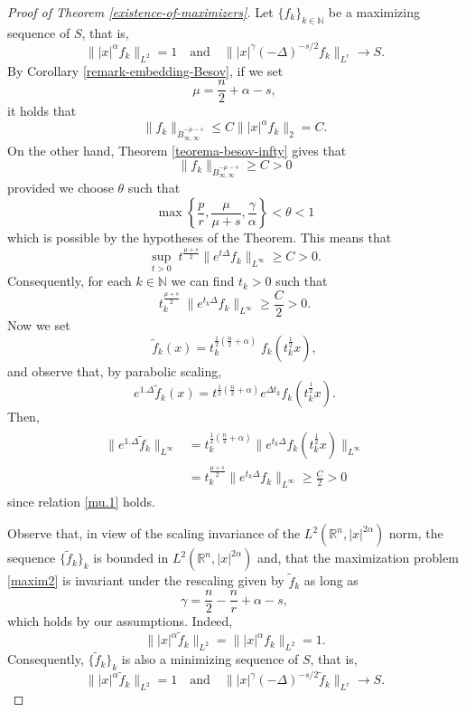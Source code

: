 \documentclass[12pt]{amsart}
\newcommand {\N}{\mathbb{N}}
\newcommand {\R}{\mathbb{R}}
\begin{document}
\begin{proof}[Proof of Theorem \ref{existence-of-maximizers}]
	Let $\{f_k\}_{k\in\N}$ be a maximizing sequence of $S$, that is, 
	\begin{equation} \label{minim}
		\| |x|^\alpha  f_k \|_{L^2} = 1  \quad\mbox{and}\quad \| |x|^\gamma  (-\Delta)^{-s/2} f_k \|_{L^r} \to S .
	\end{equation}
	By Corollary \ref{remark-embedding-Besov}, if we set
	\begin{equation} \label{mu.1}
		\mu  = \frac{n}{2} + \alpha -s,
	\end{equation}
	it holds that
	$$ 
		\| f_k \|_{\dot{B}^{-\mu-s}_{\infty,\infty}} \leq
		C \| |x|^\alpha f_k \|_2 = C.
	$$
	On the other hand, Theorem \ref{teorema-besov-infty}
 gives that
	$$
		  \| f_k \|_{\dot{B}^{-\mu-s}_{\infty,\infty}} \geq C >0 
	$$
	provided we choose $\theta$ such that 
	$$
	\max \left\{ \frac{p}{r}, \frac{\mu}{\mu+s}, \frac{\gamma}{\alpha} \right\} < \theta <1
	$$
	which is possible by the hypotheses of the Theorem.
	This means that
	$$ 
		\sup_{t>0} \;  t^\frac{\mu+s}{2} \| e^{t\Delta} f_k \|_{L^\infty} \geq C>0.
	$$ 
	Consequently, for each $k \in \N$ we can find $t_k>0$ such that
	$$ 
		t_k^\frac{\mu+s}{2} \; \|  e^{t_k\Delta} f_k \|_{L^\infty} \geq \frac{C}{2} > 0.
	$$	
	Now we set
	\begin{equation} \label{reescale}
	 \tilde{f}_k(x)= t_k^{\frac{1}{2}(\frac{n}{2}+\alpha)} \;  f_k(t_k^\frac12 x),
	\end{equation}	
	and observe that, by parabolic scaling, 
	$$
	 e^{1.\Delta} \tilde f_k (x) = t^{\frac12 (\frac{n}{2}+\alpha)} e^{\Delta t_k} f_k( t_k^{\frac12} x).
	$$	
	Then,
	\begin{align} \label{ectt}
	\begin{split}
		\|  e^{1.\Delta} \tilde f_k\|_{L^\infty}&=t_k^{\frac{1}{2}(\frac{n}{2}+\alpha)}
		\| e^{t_k\Delta}   f_k(t_k^\frac12 x)\|_{L^\infty}\\
		&=t_k^\frac{\mu+s}{2}  \|   e^{t_k \Delta}   f_k\|_{L^\infty} \geq \frac{C}{2}>0
	\end{split}		
	\end{align} 	
	since relation \eqref{mu.1} holds.

	Observe that, in view of the scaling invariance of the $L^2(\R^n,|x|^{2 \alpha})$ norm, the sequence $\{\tilde f_k\}_k$ is bounded in $L^2(\R^n,|x|^{2\alpha })$ and,  that the maximization problem \eqref{maxim2} is invariant under the rescaling given by $\tilde f_k$ as long as
	$$
		\gamma=\frac{n}{2}-\frac{n}{r}+\alpha-s,
	$$
	which holds by our assumptions. Indeed, 
	\begin{equation} \label{acotado}
		 \| |x|^\alpha \tilde{f}_k\|_{L^2} = \| |x|^\alpha f_k\|_{L^2}=1.
	\end{equation}
	Consequently, $\{\tilde f_k\}_k$ is also a minimizing sequence of $S$, that is, 
	\begin{equation}  \label{minimftilde}
		\| |x|^\alpha  \tilde f_k \|_{L^2} = 1  \quad\mbox{and}\quad \| |x|^\gamma  (-\Delta)^{-s/2} \tilde f_k \|_{L^r} \to S .
	\end{equation}	
	

\end{proof}
\end{document}
